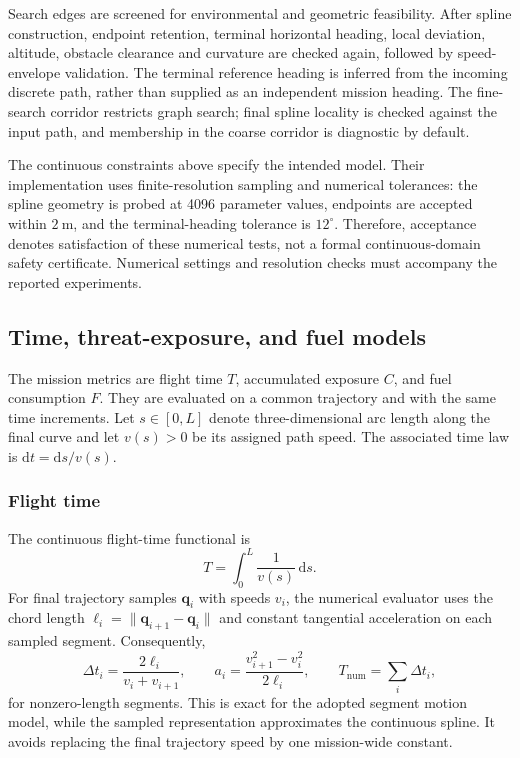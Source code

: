 \documentclass[preprint,12pt]{elsarticle}
\begin{document}
Search edges are screened for environmental and geometric feasibility.
After spline construction, endpoint retention, terminal horizontal heading,
local deviation, altitude, obstacle clearance and curvature are checked
again, followed by speed-envelope validation. The terminal reference heading
is inferred from the incoming discrete path, rather than supplied as an
independent mission heading. The fine-search corridor restricts graph search;
final spline locality is checked against the input path, and membership in
the coarse corridor is diagnostic by default.

The continuous constraints above specify the intended model. Their
implementation uses finite-resolution sampling and numerical tolerances:
the spline geometry is probed at 4096 parameter values, endpoints are accepted
within $2~\mathrm{m}$, and the terminal-heading tolerance is $12^\circ$.
Therefore, acceptance denotes satisfaction of these numerical tests, not
a formal continuous-domain safety certificate. Numerical settings and
resolution checks must accompany the reported experiments.

\subsection{Time, threat-exposure, and fuel models}
\label{pr:sec:metrics}
The mission metrics are flight time $T$, accumulated exposure $C$, and
fuel consumption $F$. They are evaluated on a common trajectory and with
the same time increments. Let $s\in[0,L]$ denote three-dimensional arc
length along the final curve and let $v(s)>0$ be its assigned path speed.
The associated time law is $\mathrm{d}t=\mathrm{d}s/v(s)$.

\subsubsection{Flight time}
The continuous flight-time functional is
\begin{equation}
 T=\int_0^L\frac{1}{v(s)}\,\mathrm{d}s.
 \label{pr:eq:time}
\end{equation}
For final trajectory samples $\mathbf{q}_i$ with speeds $v_i$, the numerical
evaluator uses the chord length
$\ell_i=\|\mathbf{q}_{i+1}-\mathbf{q}_i\|$ and constant tangential
acceleration on each sampled segment. Consequently,
\begin{equation}
 \Delta t_i=\frac{2\ell_i}{v_i+v_{i+1}},\qquad
 a_i=\frac{v_{i+1}^2-v_i^2}{2\ell_i},\qquad
 T_{\mathrm{num}}=\sum_i\Delta t_i,
 \label{pr:eq:segmenttime}
\end{equation}
for nonzero-length segments. This is exact for the adopted segment motion
model, while the sampled representation approximates the continuous spline.
It avoids replacing the final trajectory speed by one mission-wide constant.
\end{document}
